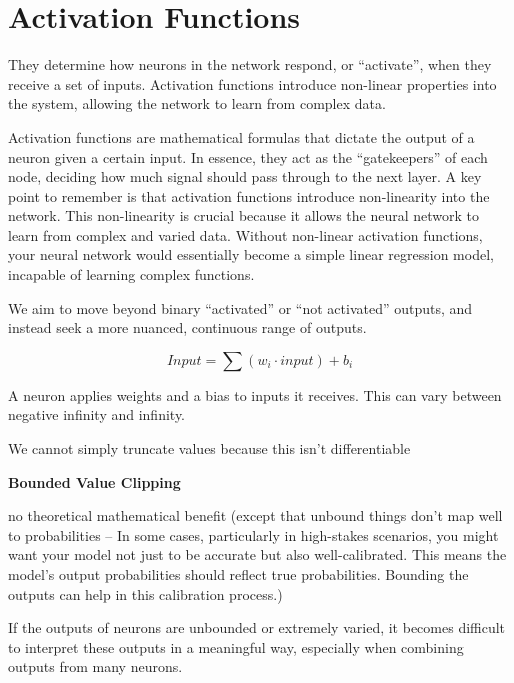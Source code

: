 \documentclass[11pt]{article}
\begin{document}


\tableofcontents

\clearpage

\section{Activation Functions}

They determine how neurons in the network respond, or ``activate'', when they receive a set of inputs. Activation functions introduce non-linear properties into the system, allowing the network to learn from complex data.

Activation functions are mathematical formulas that dictate the output of a neuron given a certain input. In essence, they act as the ``gatekeepers'' of each node, deciding how much signal should pass through to the next layer. A key point to remember is that activation functions introduce non-linearity into the network. This non-linearity is crucial because it allows the neural network to learn from complex and varied data. Without non-linear activation functions, your neural network would essentially become a simple linear regression model, incapable of learning complex functions.

We aim to move beyond binary ``activated'' or ``not activated'' outputs, and instead seek a more nuanced, continuous range of outputs. 

\begin{equation*}
    Input = \sum(w_i \cdot input) + b_i
\end{equation*}

A neuron applies weights and a bias to inputs it receives. This can vary between negative infinity and infinity. 

We cannot simply truncate values because this isn't differentiable 

\textbf{Bounded Value Clipping}

no theoretical mathematical benefit (except that unbound things don't map well to probabilities -- In some cases, particularly in high-stakes scenarios, you might want your model not just to be accurate but also well-calibrated. This means the model's output probabilities should reflect true probabilities. Bounding the outputs can help in this calibration process.)

If the outputs of neurons are unbounded or extremely varied, it becomes difficult to interpret these outputs in a meaningful way, especially when combining outputs from many neurons.
\end{document}
